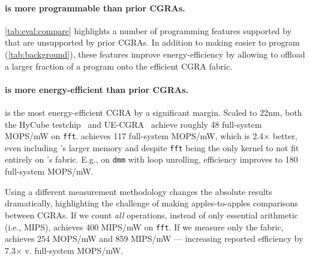 
\paragraph{\riptide is more programmable than prior CGRAs.}
%
\autoref{tab:eval:compare} highlights a number of programming
features supported by \riptide that are unsupported by prior CGRAs.
%
In addition to making \riptide easier to program (\autoref{tab:background}),
these features improve energy-efficiency by allowing \riptide to offload a larger fraction
of a program onto the efficient CGRA fabric.

\paragraph{\riptide is more energy-efficient than prior CGRAs.}
\riptide is the most energy-efficient CGRA by a significant margin.
% 
Scaled to 22nm,
both the HyCube testchip~\cite{wang2019hycube} and
UE-CGRA~\cite{torng_pan_2021} achieve roughly 48 full-system MOPS/mW on {\tt fft}.
%
% 
\riptide achieves 117 full-system MOPS/mW,
which is 2.4$\times$ better,
%
even including \riptide's larger memory and
despite {\tt fft} being the only kernel to not fit entirely on \riptide's fabric.
%
E.g., on {\tt dmm} with loop unrolling,
efficiency improves to 180 full-system MOPS/mW.
% 
% 

Using a different measurement methodology changes the absolute results dramatically,
highlighting the challenge of making apples-to-apples comparisons between CGRAs.
%
If we count {\em all} operations, instead of only essential arithmetic (i.e., MIPS),
\riptide achieves 400 MIPS/mW on {\tt fft}.
%
If we measure only the fabric, \riptide achieves 254 MOPS/mW
and 859 MIPS/mW --- increasing reported efficiency by 7.3$\times$ v. full-system MOPS/mW.

